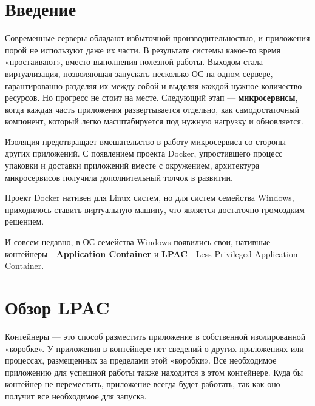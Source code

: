 


%
\tableofcontents
\clearpage

%

\section*{Введение}
Современные серверы обладают избыточной производительностью, и приложения порой не используют даже их части. В результате системы какое-то время «простаивают», вместо выполнения полезной работы. Выходом стала виртуализация, позволяющая запускать несколько ОС на одном сервере, гарантированно разделяя их между собой и выделяя каждой нужное количество ресурсов. Но прогресс не стоит на месте. Следующий этап — \textbf{микросервисы}, когда каждая часть приложения развертывается отдельно, как самодостаточный компонент, который легко масштабируется под нужную нагрузку и обновляется. 

Изоляция предотвращает вмешательство в работу микросервиса со стороны других приложений. С появлением проекта Docker, упростившего процесс упаковки и доставки приложений вместе с окружением, архитектура микросервисов получила дополнительный толчок в развитии.

Проект Docker нативен для Linux систем, но для систем семейства Windows, приходилось ставить виртуальную машину, что является достаточно громоздким решением.

И совсем недавно, в ОС семейства Windows появились свои, нативные контейнеры - \textbf{Application Container} и \textbf{LPAC} - Less Privileged Application Container.
\clearpage

\section{Обзор LPAC}
Контейнеры — это способ разместить приложение в собственной изолированной «коробке». У приложения в контейнере нет сведений о других приложениях или процессах, размещенных за пределами этой «коробки». Все необходимое приложению для успешной работы также находится в этом контейнере. Куда бы контейнер не переместить, приложение всегда будет работать, так как оно получит все необходимое для запуска.

